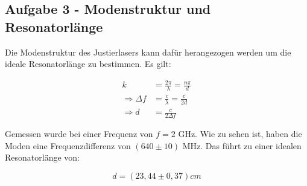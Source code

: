 \subsection{Aufgabe 3 - Modenstruktur und Resonatorlänge}

Die Modenstruktur des Justierlasers kann dafür herangezogen werden um die ideale Resonatorlänge zu bestimmen. Es gilt:

\begin{align}
k &= \frac{2\pi}{\lambda}  = \frac{n\pi}{d} \\
\Rightarrow \Delta f &= \frac{c}{\lambda} = \frac{c}{2d} \\
\Rightarrow d &= \frac{c}{2\Delta f}
\end{align}


Gemessen wurde bei einer Frequenz von $f = 2$ GHz. Wie zu sehen ist, haben die Moden eine Frequenzdifferenz von $(640 \pm 10)$ MHz. Das führt zu einer idealen Resonatorlänge von:

\begin{equation}
d = (23,44 \pm 0,37)cm
\end{equation}

